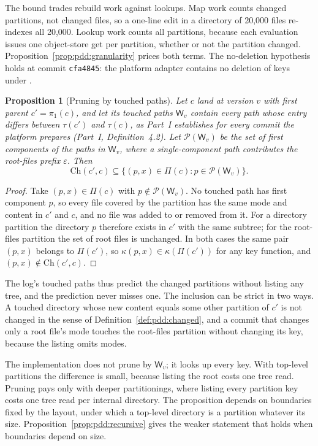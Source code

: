 \documentclass[11pt,letterpaper]{article}
\newtheorem{proposition}[theorem]{Proposition}
\theoremstyle{definition}
\theoremstyle{remark}
\newcommand{\tree}{\tau}
\newcommand{\W}{\mathsf{W}}
\newcommand{\Pfx}{\mathcal{P}}
\newcommand{\Ch}{\mathrm{Ch}}
\DeclareRobustCommand{\code}[1]{{\def\_{\textunderscore\allowbreak}\texttt{#1}}}
\begin{document}
The bound trades rebuild work against lookups. Map work counts changed partitions, not changed files, so a one-line edit in a directory of 20,000 files re-indexes all 20,000. Lookup work counts all partitions, because each evaluation issues one object-store get per partition, whether or not the partition changed. Proposition~\ref{prop:pdd:granularity} prices both terms. The no-deletion hypothesis holds at commit \code{cfa4845}: the platform adapter contains no deletion of keys under .

\begin{proposition}[Pruning by touched paths]
\label{prop:pdd:pruning}
Let $c$ land at version $v$ with first parent $c'=\pi_1(c)$, and let its touched paths $\W_v$ contain every path whose entry differs between $\tree(c')$ and $\tree(c)$, as Part~I establishes for every commit the platform prepares (Part~I, Definition~4.2). Let $\Pfx(\W_v)$ be the set of first components of the paths in $\W_v$, where a single-component path contributes the root-files prefix $\varepsilon$. Then
\[
\Ch(c',c)\subseteq\{(p,x)\in\Pi(c):p\in\Pfx(\W_v)\}.
\]
\end{proposition}

\begin{proof}
Take $(p,x)\in\Pi(c)$ with $p\notin\Pfx(\W_v)$. No touched path has first component $p$, so every file covered by the partition has the same mode and content in $c'$ and $c$, and no file was added to or removed from it. For a directory partition the directory $p$ therefore exists in $c'$ with the same subtree; for the root-files partition the set of root files is unchanged. In both cases the same pair $(p,x)$ belongs to $\Pi(c')$, so $\kappa(p,x)\in\kappa(\Pi(c'))$ for any key function, and $(p,x)\notin\Ch(c',c)$.
\end{proof}

The log's touched paths thus predict the changed partitions without listing any tree, and the prediction never misses one. The inclusion can be strict in two ways. A touched directory whose new content equals some other partition of $c'$ is not changed in the sense of Definition~\ref{def:pdd:changed}, and a commit that changes only a root file's mode touches the root-files partition without changing its key, because the listing omits modes.

The implementation does not prune by $\W_v$; it looks up every key. With top-level partitions the difference is small, because listing the root costs one tree read. Pruning pays only with deeper partitionings, where listing every partition key costs one tree read per internal directory. The proposition depends on boundaries fixed by the layout, under which a top-level directory is a partition whatever its size. Proposition~\ref{prop:pdd:recursive} gives the weaker statement that holds when boundaries depend on size.
\end{document}
